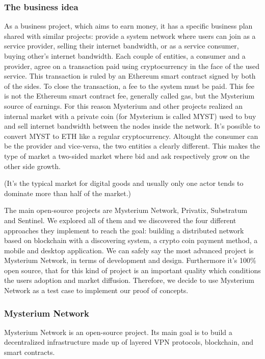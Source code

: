 \documentclass[]{article}
\begin{document}
	\subsubsection{The business idea}
	As a business project, which aims to earn money, it has a specific business plan shared with similar projects: provide a system network where users can join as a service provider, selling their internet bandwidth, or as a service consumer, buying other's internet bandwidth. Each couple of entities, a consumer and a provider, agree on a transaction paid using cryptocurrency in the face of the used service. This transaction is ruled by an Ethereum smart contract signed by both of the sides. To close the transaction, a fee to the system must be paid. This fee is not the Ethereum smart contract fee, generally called gas, but the Mysterium source of earnings. For this reason Mysterium and other projects realized an internal market with a private coin (for Mysterium is called MYST) used to buy and sell internet bandwidth between the nodes inside the network. It's possible to convert MYST to ETH like a regular cryptocurrency.
	Altought the consumer can be the provider and vice-versa, the two entities a clearly different. This makes the type of market a two-sided market where bid and ask respectively grow on the other side growth. 

	
	(It's the typical market for digital goods and usually only one actor tends to dominate more than half of the market.)
		
	The main open-source projects are Mysterium Network, Privatix, Substratum and Sentinel. We explored all of them and we discovered the four different approaches they implement to reach the goal: building a distributed network based on blockchain with a discovering system, a crypto coin payment method, a mobile and desktop application.
	We can safely say the most advanced project is Mysterium Network, in terms of development and design. Furthermore it's 100\% open source, that for this kind of project is an important quality which conditions the users adoption and market diffusion.
	Therefore, we decide to use Mysterium Network as a test case to implement our proof of concepts.
	
	\subsubsection{Mysterium Network}
	
	Mysterium Network is an open-source project. Its main goal is to build a decentralized infrastructure made up of layered VPN protocols, blockchain, and smart contracts.
\end{document}
